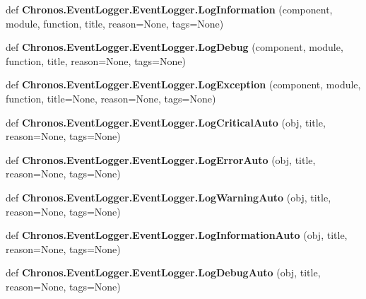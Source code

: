 \begin{DoxyCompactItemize}
\item 
def {\bfseries Chronos.\+Event\+Logger.\+Event\+Logger.\+Log\+Information} (component, module, function, title, reason=None, tags=None)\hypertarget{group__PyInfrastructure_ga7029459dd9177ebc0ebdb36f1a82ca35}{}\label{group__PyInfrastructure_ga7029459dd9177ebc0ebdb36f1a82ca35}

\item 
def {\bfseries Chronos.\+Event\+Logger.\+Event\+Logger.\+Log\+Debug} (component, module, function, title, reason=None, tags=None)\hypertarget{group__PyInfrastructure_ga71b44589d3646e2a363b08e21742e631}{}\label{group__PyInfrastructure_ga71b44589d3646e2a363b08e21742e631}

\item 
def {\bfseries Chronos.\+Event\+Logger.\+Event\+Logger.\+Log\+Exception} (component, module, function, title=None, reason=None, tags=None)\hypertarget{group__PyInfrastructure_ga7e520c8098d32b57ac85643035e26cec}{}\label{group__PyInfrastructure_ga7e520c8098d32b57ac85643035e26cec}

\item 
def {\bfseries Chronos.\+Event\+Logger.\+Event\+Logger.\+Log\+Critical\+Auto} (obj, title, reason=None, tags=None)\hypertarget{group__PyInfrastructure_ga09e4c587754a4d81a3022c866ec0d3fb}{}\label{group__PyInfrastructure_ga09e4c587754a4d81a3022c866ec0d3fb}

\item 
def {\bfseries Chronos.\+Event\+Logger.\+Event\+Logger.\+Log\+Error\+Auto} (obj, title, reason=None, tags=None)\hypertarget{group__PyInfrastructure_gaeaa9858da6229a4edb0b1696b5d27d55}{}\label{group__PyInfrastructure_gaeaa9858da6229a4edb0b1696b5d27d55}

\item 
def {\bfseries Chronos.\+Event\+Logger.\+Event\+Logger.\+Log\+Warning\+Auto} (obj, title, reason=None, tags=None)\hypertarget{group__PyInfrastructure_ga676566b77ed20124ae244f8b01fcbf39}{}\label{group__PyInfrastructure_ga676566b77ed20124ae244f8b01fcbf39}

\item 
def {\bfseries Chronos.\+Event\+Logger.\+Event\+Logger.\+Log\+Information\+Auto} (obj, title, reason=None, tags=None)\hypertarget{group__PyInfrastructure_ga17dc0827d49cf3722999949a125cde9f}{}\label{group__PyInfrastructure_ga17dc0827d49cf3722999949a125cde9f}

\item 
def {\bfseries Chronos.\+Event\+Logger.\+Event\+Logger.\+Log\+Debug\+Auto} (obj, title, reason=None, tags=None)\hypertarget{group__PyInfrastructure_ga2499bad064c7b178489b5cef63d4739c}{}\label{group__PyInfrastructure_ga2499bad064c7b178489b5cef63d4739c}


\end{DoxyCompactItemize}

